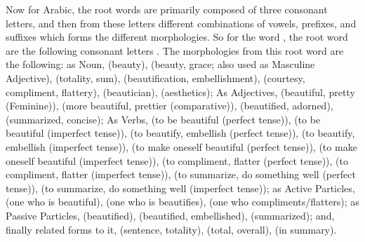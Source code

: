 Now for Arabic, the root words are primarily composed of three consonant letters, and then from these letters different combinations of vowels, prefixes, and suffixes which forms the different morphologies. So for the word  , the root word are the following consonant letters  . The morphologies from this root word are the following: as Noun,   (beauty),   (beauty, grace; also used as Masculine Adjective),   (totality, sum),   (beautification, embellishment),   (courtesy, compliment, flattery),    (beautician),   (aesthetics); As Adjectives,    (beautiful, pretty (Feminine)),   (more beautiful, prettier (comparative)),   (beautified, adorned),   (summarized, concise); As Verbs,   (to be beautiful (perfect tense)),   (to be beautiful (imperfect tense)),   (to beautify, embellish (perfect tense)),   (to beautify, embellish (imperfect tense)),   (to make oneself beautiful (perfect tense)),   (to make oneself beautiful (imperfect tense)),   (to compliment, flatter (perfect tense)),   (to compliment, flatter (imperfect tense)),   (to summarize, do something well (perfect tense)),   (to summarize, do something well (imperfect tense)); as Active Particles,   (one who is beautiful),   (one who is beautifies),   (one who compliments/flatters); as Passive Particles, \newline {} (beautified),   (beautified, embellished),   (summarized); and, finally related forms to it,   (sentence, totality),   (total, overall),   (in summary).

